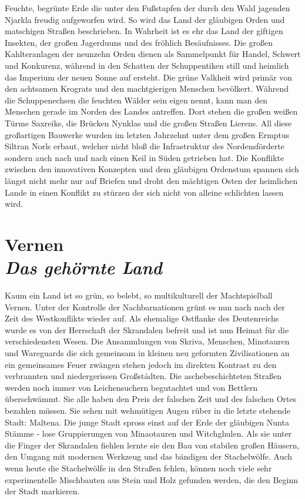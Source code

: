 Feuchte, begrünte Erde die unter den Fußstapfen der durch den Wald jagenden Njarkla freudig aufgeworfen wird. So wird das Land der gläubigen Orden und matschigen Straßen beschrieben. In Wahrheit ist es ehr das Land der giftigen Insekten, der großen Jagerduuns und des fröhlich Besäufnisses. Die großen Kahlteranlagen der neunzehn Orden dienen als Sammelpunkt für Handel, Schwert und Konkurenz, während in den Schatten der Schuppentiken still und heimlich das Imperium der neuen Sonne auf ersteht.
Die grüne Valkheit wird primär von den achtsamen Krograts und den machtgierigen Menschen bevölkert. Während die Schuppenechsen die feuchten Wälder sein eigen nennt, kann man den Menschen gerade im Norden des Landes antreffen. Dort stehen die großen weißen Türme Saxreiks, die Brücken Nynklas und die großen Straßen Lierens. All diese großartigen Bauwerke wurden im letzten Jahrzehnt unter dem großen Ermptus Siltran Norls erbaut, welcher nicht bloß die Infrastruktur des Nordensförderte sondern auch nach und nach einen Keil in Süden getrieben hat. Die Konflikte zwischen den innovativen Konzepten und dem gläubigen Ordenstum spannen sich längst nicht mehr nur auf Briefen und droht den mächtigen Osten der heimlichen Lande in einen Konflikt zu stürzen der sich nicht von alleine schlichten lassen wird.

\section*{Vernen \\ \textit{Das gehörnte Land}}

Kaum ein Land ist so grün, so belebt, so multikulturell der Machtspielball Vernen. Unter der Kontrolle der Nachbarnationen grünt es nun nach nach der Zeit des Westkonflikts wieder auf. Als ehemalige Ostflanke des Deutenreichs wurde es von der Herrschaft der Skrandalen befreit und ist nun Heimat für die verschiedensten Wesen. Die Ansammlungen von Skriva, Menschen, Minotauren und Wareguards die sich gemeinsam in kleinen neu geformten Zivilisationen an ein gemeinsames Feuer zwängen stehen jedoch im direkten Kontrast zu den verbrannten und niedergerissen Großstädten. Die aschebeschichteten Straßen werden noch immer von Leichensuchern begutachtet und von Bettlern überschwämmt. Sie alle haben den Preis der falschen Zeit und des falschen Ortes bezahlen müssen. Sie sehen mit wehmütigen Augen rüber in die letzte stehende Stadt: Maltena. Die junge Stadt spross einst auf der Erde der gläubigen Nunta Stämme - lose Gruppierungen von Minaotauren und Witchghulen. Als sie unter die Finger der Skrandalen fiehlen lernte sie den Bau von stabilen großen Häusern, den Umgang mit modernen Werkzeug und das bändigen der Stachelwölfe. Auch wenn heute die Stachelwölfe in den Straßen fehlen, können noch viele sehr experimentelle Mischbauten aus Stein und Holz gefunden werden, die den Beginn der Stadt markieren.